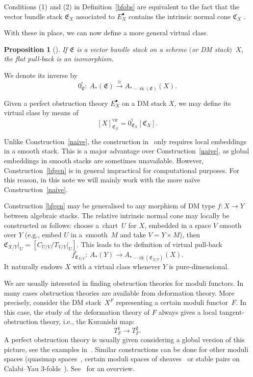 \documentclass[pdftex]{sigma}
\numberwithin{equation}{section}
\newtheorem{Proposition}[Theorem]{Proposition}
 { \theoremstyle{definition}
\newtheorem{Definition}[Theorem]{Definition}
\newtheorem{Note}[Theorem]{Note}
\newtheorem{Example}[Theorem]{Example}
\newtheorem{Remark}[Theorem]{Remark}
\newtheorem{notation}[Theorem]{Notation}
\newtheorem{construction}[Theorem]{Construction}
}
\newcommand{\vv}{\mathrm{vir}}
\newcommand{\E}{\mathfrak E}
\newcommand{\rk}{\operatorname{rk}}
\begin{document}
Conditions (1) and (2) in Definition~\ref{bfobs} are equivalent to the fact that the vector bundle stack $\mathfrak{E}_X$ associated to $E^{\bullet}_{X}$ contains the intrinsic normal cone $\mathfrak C_X$ \cite[Theorem~4.5]{BerFan}.

With these in place, we can now define a more general virtual class.
 \begin{Proposition}[\cite{Kstacks}] If $\E$ is a vector bundle stack on a scheme $($or DM stack$)$~$X$, the flat pull-back is an isomorphism.
\end{Proposition}
We denote its inverse by
\[0^!_{\E}\colon \ A_*(\E)\xrightarrow{\cong} A_{*-\rk(\mathfrak{E})}(X).\]

\begin{construction} \label{bfgen} Given a perfect obstruction theory $E^\bullet_X$ on a DM stack $X$, we may define its virtual class by means of
\[[X]^{\vv}_{\E_{X}}=0^!_{\E_{X}}[\mathfrak C_X].\]
\end{construction}
\begin{Remark} Unlike Construction~\ref{naive}, the construction in~\cite{BerFan} only requires local embeddings in a smooth stack. This is a major advantage over Construction~\ref{naive}, as global embeddings in smooth stacks are sometimes unavailable. However, Construction~\ref{bfgen} is in general impractical for computational purposes. For this reason, in this note we will mainly work with the more na\"ive Construction~\ref{naive}.
\end{Remark}
\begin{Remark}
 Construction \ref{bfgen} may be generalised to any morphism of DM type $f\colon X\to Y$ between algebraic stacks. The relative intrinsic normal cone may locally be constructed as follows: choose a~chart~$U$ for $X$, embedded in a space $V$ smooth over $Y$ (e.g., embed $U$ in a~smooth~$M$ and take $V=Y\times M$), then $\mathfrak C_{X/Y}|_U=[C_{U/V}/T_{V/Y}|_U]$. This leads to the definition of virtual pull-back~\cite{vir-pull}
 \[f^!_{\E_{X/Y}}\colon \ A_*(Y)\to A_{*-\rk(\E_{X/Y})}(X).\]
 It naturally endows $X$ with a virtual class whenever $Y$ is pure-dimensional.
\end{Remark}

\begin{Remark} We are usually interested in finding obstruction theories for moduli functors. In many cases obstruction theories are available from deformation theory. More precisely, consider the DM stack~$X^F$ representing a certain moduli functor~$F$. In this case, the study of the deformation theory of $F$ always gives a local tangent-obstruction theory, i.e., the Kuranishi map:
\[T^1_F\to T^2_F.\]
A perfect obstruction theory is usually given considering a global version of this picture, see the examples in~\cite{Ber}. Similar constructions can be done for other moduli spaces (quasimap spaces~\cite{CF-K-M}, certain moduli spaces of sheaves~\cite{thomas} or stable pairs on Calabi--Yau 3-folds~\cite{pan-thomas}). See~\cite{rt} for an overview.
\end{Remark}
\end{document}
